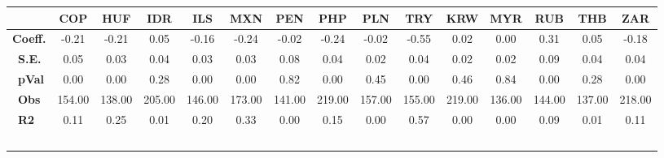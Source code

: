 \begin{tabular}{l|cccccccccccccc}
\hline
&\textbf{COP}&\textbf{HUF}&\textbf{IDR}&\textbf{ILS}&\textbf{MXN}&\textbf{PEN}&\textbf{PHP}&\textbf{PLN}&\textbf{TRY}&\textbf{KRW}&\textbf{MYR}&\textbf{RUB}&\textbf{THB}&\textbf{ZAR}\\\hline
\textbf{Coeff.}&-0.21&-0.21&0.05&-0.16&-0.24&-0.02&-0.24&-0.02&-0.55&0.02&0.00&0.31&0.05&-0.18\\\
\textbf{S.E.}&0.05&0.03&0.04&0.03&0.03&0.08&0.04&0.02&0.04&0.02&0.02&0.09&0.04&0.04\\\
\textbf{pVal}&0.00&0.00&0.28&0.00&0.00&0.82&0.00&0.45&0.00&0.46&0.84&0.00&0.28&0.00\\\
\textbf{Obs}&154.00&138.00&205.00&146.00&173.00&141.00&219.00&157.00&155.00&219.00&136.00&144.00&137.00&218.00\\\
\textbf{R2}&0.11&0.25&0.01&0.20&0.33&0.00&0.15&0.00&0.57&0.00&0.00&0.09&0.01&0.11\\\
\end{tabular}
